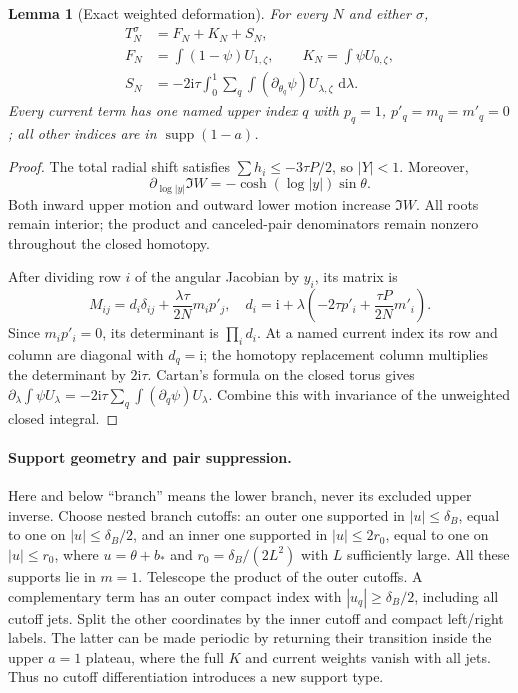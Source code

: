 \documentclass[11pt]{article}
\numberwithin{equation}{section}
\newtheorem{lemma}[theorem]{Lemma}
\theoremstyle{definition}
\newcommand{\ii}{\mathrm i}
\newcommand{\dd}{\,\mathrm d}
\begin{document}
\begin{lemma}[Exact weighted deformation]\label{iso:deformation}
For every $N$ and either $\sigma$,
\begin{align*}
 T_N^\sigma&=F_N+K_N+S_N,\\
 F_N&=\int(1-\psi)U_{1,\zeta},\qquad
 K_N=\int\psi U_{0,\zeta},\\
 S_N&=-2\ii\tau\int_0^1\sum_q
             \int(\partial_{\theta_q}\psi)U_{\lambda,\zeta}\,\dd\lambda.
\end{align*}
Every current term has one named upper index $q$ with
$p_q=1$, $p'_q=m_q=m'_q=0$; all other indices are in
$\operatorname{supp}(1-a)$.
\end{lemma}

\begin{proof}
The total radial shift satisfies $\sum h_i\le-3\tau P/2$, so $|Y|<1$.
Moreover,
\[
 \partial_{\log|y|}\Im W=-\cosh(\log|y|)\sin\theta.
\]
Both inward upper motion and outward lower motion increase $\Im W$.
All roots remain interior; the product and canceled-pair denominators
remain nonzero throughout the closed homotopy.

After dividing row $i$ of the angular Jacobian by $y_i$, its matrix is
\[
 M_{ij}=d_i\delta_{ij}+\frac{\lambda\tau}{2N}m_i p'_j,
 \quad d_i=\ii+\lambda\left(-2\tau p'_i+
                                      \frac{\tau P}{2N}m'_i\right).
\]
Since $m_i p'_i=0$, its determinant is $\prod_i d_i$.
At a named current index its row and column are diagonal with $d_q=\ii$;
the homotopy replacement column multiplies the determinant by $2\ii\tau$.
Cartan's formula on the closed torus gives
$\partial_\lambda\int\psi U_\lambda
=-2\ii\tau\sum_q\int(\partial_q\psi)U_\lambda$.
Combine this with invariance of the unweighted closed integral.
\end{proof}

\paragraph{Support geometry and pair suppression.}
Here and below ``branch'' means the lower branch, never its excluded
upper inverse. Choose nested branch cutoffs: an outer one supported in
$|u|\le\delta_B$, equal to one on $|u|\le\delta_B/2$, and an inner
one supported in $|u|\le2r_0$, equal to one on $|u|\le r_0$, where
$u=\theta+b_*$ and $r_0=\delta_B/(2L^2)$ with $L$ sufficiently large.
All these supports lie in $m=1$. Telescope the product of the outer
cutoffs. A complementary term has an outer compact index with
$|u_q|\ge\delta_B/2$, including all cutoff jets. Split the other
coordinates by the inner cutoff and compact left/right labels. The latter
can be made periodic by returning their transition inside the upper
$a=1$ plateau, where the full $K$ and current weights vanish with all
jets. Thus no cutoff differentiation introduces a new support type.
\end{document}
